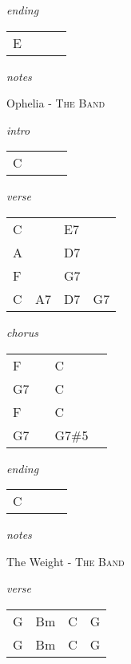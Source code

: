 \documentclass[12pt]{article}
\begin{document}
\textit{ending}

\begin{tabular}{|P{1.25in}|P{1.25in}|P{1.25in}|P{1.25in}|}
  E &   &   &   \\
\end{tabular}

\textit{notes}



\newpage

{\Huge Ophelia} {\huge - \textsc{The Band}}

\huge
\textit{intro}

\begin{tabular}{|P{1.25in}|P{1.25in}|P{1.25in}|P{1.25in}|}
  C &   &   &   \\
\end{tabular}

\textit{verse}

\begin{tabular}{|P{1.25in}|P{1.25in}|P{1.25in}|P{1.25in}|}
  C &   & E7  &   \\
  A &   & D7  &   \\
  F &   &  G7 &   \\
  C &  A7 &  D7 &  G7 \\
\end{tabular}

\textit{chorus}

\begin{tabular}{|P{1.25in}|P{1.25in}|P{1.25in}|P{1.25in}|}
  F &   & C  &   \\
  G7 &   & C  &   \\
  F &   & C  &   \\
  G7 &   & G7\#5  &   \\
\end{tabular}

\textit{ending}

\begin{tabular}{|P{1.25in}|P{1.25in}|P{1.25in}|P{1.25in}|}
  C &   &   &   \\
\end{tabular}

\textit{notes}



\newpage

{\Huge The Weight} {\huge - \textsc{The Band}}

\huge
\textit{verse}

\begin{tabular}{|P{1.25in}|P{1.25in}|P{1.25in}|P{1.25in}|}
  G  & Bm  & C  &  G \\
  G  & Bm  & C  &  G \\
\end{tabular}
\end{document}
